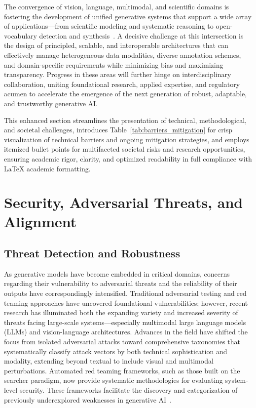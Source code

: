 The convergence of vision, language, multimodal, and scientific domains is fostering the development of unified generative systems that support a wide array of applications—from scientific modeling and systematic reasoning to open-vocabulary detection and synthesis~\cite{ref1,ref2,ref3,ref5,ref6,ref7,ref8,ref9,ref10,ref12,ref13,ref14,ref15,ref16,ref18,ref21,ref22,ref24,ref25,ref26,ref27,ref28,ref29,ref30,ref31,ref32,ref33,ref34,ref35,ref39,ref40,ref42,ref43,ref44,ref45,ref51,ref52,ref53,ref54,ref55,ref56,ref57,ref58,ref59,ref60,ref63,ref67,ref69,ref70,ref76,ref77,ref78,ref79,ref80,ref81,ref82}. A decisive challenge at this intersection is the design of principled, scalable, and interoperable architectures that can effectively manage heterogeneous data modalities, diverse annotation schemes, and domain-specific requirements while minimizing bias and maximizing transparency. Progress in these areas will further hinge on interdisciplinary collaboration, uniting foundational research, applied expertise, and regulatory acumen to accelerate the emergence of the next generation of robust, adaptable, and trustworthy generative AI.

This enhanced section streamlines the presentation of technical, methodological, and societal challenges, introduces Table~\ref{tab:barriers_mitigation} for crisp visualization of technical barriers and ongoing mitigation strategies, and employs itemized bullet points for multifaceted societal risks and research opportunities, ensuring academic rigor, clarity, and optimized readability in full compliance with LaTeX academic formatting.

\section{Security, Adversarial Threats, and Alignment}

\subsection{Threat Detection and Robustness}

As generative models have become embedded in critical domains, concerns regarding their vulnerability to adversarial threats and the reliability of their outputs have correspondingly intensified. Traditional adversarial testing and red teaming approaches have uncovered foundational vulnerabilities; however, recent research has illuminated both the expanding variety and increased severity of threats facing large-scale systems—especially multimodal large language models (LLMs) and vision-language architectures. Advances in the field have shifted the focus from isolated adversarial attacks toward comprehensive taxonomies that systematically classify attack vectors by both technical sophistication and modality, extending beyond textual to include visual and multimodal perturbations. Automated red teaming frameworks, such as those built on the searcher paradigm, now provide systematic methodologies for evaluating system-level security. These frameworks facilitate the discovery and categorization of previously underexplored weaknesses in generative AI~\cite{ref67,ref85}.

